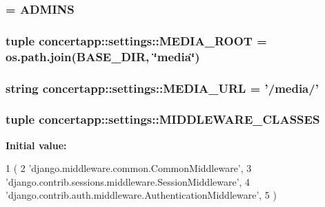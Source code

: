 \label{namespaceconcertapp_1_1settings_a8f3737759fae0b36514d05db8d388810}
\hypertarget{namespaceconcertapp_1_1settings_aea76c801264e2623a65bd856d84bb818}{
\subsubsection[{MANAGERS}]{ = {\bf ADMINS}}}
\label{namespaceconcertapp_1_1settings_aea76c801264e2623a65bd856d84bb818}
\hypertarget{namespaceconcertapp_1_1settings_ae5c34597fe021f0bef52062cb0a2e2b2}{
\subsubsection[{MEDIA\_\-ROOT}]{\setlength{\rightskip}{0pt plus 5cm}tuple {\bf concertapp::settings::MEDIA\_\-ROOT} = os.path.join({\bf BASE\_\-DIR}, \char`\"{}media\char`\"{})}}
\label{namespaceconcertapp_1_1settings_ae5c34597fe021f0bef52062cb0a2e2b2}
\hypertarget{namespaceconcertapp_1_1settings_ab3c2f7d4c5f452700bc088b16ea1e188}{
\subsubsection[{MEDIA\_\-URL}]{\setlength{\rightskip}{0pt plus 5cm}string {\bf concertapp::settings::MEDIA\_\-URL} = '/media/'}}
\label{namespaceconcertapp_1_1settings_ab3c2f7d4c5f452700bc088b16ea1e188}
\hypertarget{namespaceconcertapp_1_1settings_a7cca7f29901a7569f6ce59f8676ebeaf}{
\subsubsection[{MIDDLEWARE\_\-CLASSES}]{\setlength{\rightskip}{0pt plus 5cm}tuple {\bf concertapp::settings::MIDDLEWARE\_\-CLASSES}}}
\label{namespaceconcertapp_1_1settings_a7cca7f29901a7569f6ce59f8676ebeaf}
{\bfseries Initial value:}
\begin{DoxyCode}
1 (
2     'django.middleware.common.CommonMiddleware',
3     'django.contrib.sessions.middleware.SessionMiddleware',
4     'django.contrib.auth.middleware.AuthenticationMiddleware',
5 )
\end{DoxyCode}
